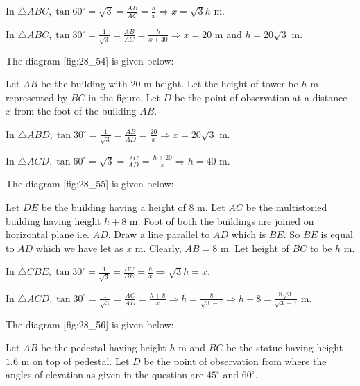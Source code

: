   In $\triangle ABC, \tan60^\circ = \sqrt{3} = \frac{AB}{AC} = \frac{h}{x} \Rightarrow x = \sqrt{3}h$ m.

  In $\triangle ABC, \tan30^\circ = \frac{1}{\sqrt{3}} = \frac{AB}{AC} = \frac{h}{x + 40} \Rightarrow x = 20$ m and $h
  = 20\sqrt{3}$ m.

\item The diagram [fig:28_54] is given below:

  \startplacefigure[reference=fig:28_54]
    \externalfigure[28_54.pdf]
  \stopplacefigure

  Let $AB$ be the building with $20$ m height. Let the height of tower be $h$ m represented by $BC$ in the
  figure. Let $D$ be the point of observation at a distance $x$ from the foot of the building $AB$.

  In $\triangle ABD, \tan30^\circ = \frac{1}{\sqrt{3}} = \frac{AB}{AD} = \frac{20}{x} \Rightarrow x = 20\sqrt{3}$ m.

  In $\triangle ACD, \tan60^\circ = \sqrt{3} = \frac{AC}{AD} = \frac{h + 20}{x}\Rightarrow h = 40$ m.

\item The diagram [fig:28_55] is given below:

  \startplacefigure[reference=fig:28_55]
    \externalfigure[28_55.pdf]
  \stopplacefigure

  Let $DE$ be the building having a height of $8$ m. Let $AC$ be the multistoried building having height
  $h + 8$ m. Foot of both the buildings are joined on horizontal plane i.e. $AD$. Draw a line parallel to $AD$
  which is $BE$. So $BE$ is equal to $AD$ which we have let as $x$ m. Clearly, $AB = 8$ m. Let
  height of $BC$ to be $h$ m.

  In $\triangle CBE, \tan30^\circ = \frac{1}{\sqrt{3}} = \frac{BC}{BE} = \frac{h}{x} \Rightarrow \sqrt{3}h = x$.

  In $\triangle ACD, \tan30^\circ = \frac{1}{\sqrt{3}} = \frac{AC}{AD} = \frac{h + 8}{x}\Rightarrow h =
  \frac{8}{\sqrt{3} - 1} \Rightarrow h + 8 = \frac{8\sqrt{3}}{\sqrt{3} - 1}$ m.

\item The diagram [fig:28_56] is given below:

  \startplacefigure[reference=fig:28_56]
    \externalfigure[28_56.pdf]
  \stopplacefigure

  Let $AB$ be the pedestal having height $h$ m and $BC$ be the statue having height $1.6$ m on top of
  pedestal. Let $D$ be the point of observation from where the angles of elevation as given in the question are
  $45^\circ$ and $60^\circ$.

